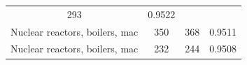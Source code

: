 \documentclass[10pt,]{article}
\begin{document}
\begin{longtable}[]{@{}cccc@{}}
\begin{minipage}[t]{0.20\columnwidth}
293\strut
\end{minipage} & \begin{minipage}[t]{0.09\columnwidth}\centering\strut
0.9522\strut
\end{minipage}\tabularnewline
\begin{minipage}[t]{0.38\columnwidth}\centering\strut
Nuclear reactors, boilers, mac\strut
\end{minipage} & \begin{minipage}[t]{0.21\columnwidth}\centering\strut
350\strut
\end{minipage} & \begin{minipage}[t]{0.20\columnwidth}\centering\strut
368\strut
\end{minipage} & \begin{minipage}[t]{0.09\columnwidth}\centering\strut
0.9511\strut
\end{minipage}\tabularnewline
\begin{minipage}[t]{0.38\columnwidth}\centering\strut
Nuclear reactors, boilers, mac\strut
\end{minipage} & \begin{minipage}[t]{0.21\columnwidth}\centering\strut
232\strut
\end{minipage} & \begin{minipage}[t]{0.20\columnwidth}\centering\strut
244\strut
\end{minipage} & \begin{minipage}[t]{0.09\columnwidth}\centering\strut
0.9508\strut
\end{minipage}\tabularnewline
\bottomrule
\end{longtable}
\end{document}
